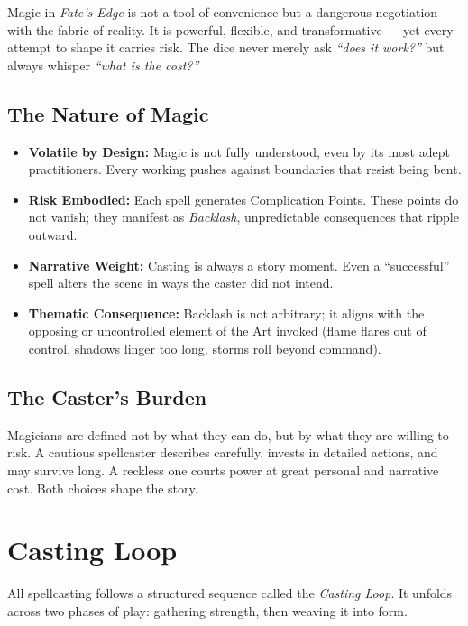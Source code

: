 \documentclass[12pt]{book}
\begin{document}
Magic in \textit{Fate’s Edge} is not a tool of convenience but a dangerous negotiation with the fabric of reality.  
It is powerful, flexible, and transformative — yet every attempt to shape it carries risk. The dice never merely ask \emph{“does it work?”} but always whisper \emph{“what is the cost?”}

\section{The Nature of Magic}
\begin{itemize}
  \item \textbf{Volatile by Design:} Magic is not fully understood, even by its most adept practitioners. Every working pushes against boundaries that resist being bent.  
  \item \textbf{Risk Embodied:} Each spell generates Complication Points. These points do not vanish; they manifest as \emph{Backlash}, unpredictable consequences that ripple outward.  
  \item \textbf{Narrative Weight:} Casting is always a story moment. Even a “successful” spell alters the scene in ways the caster did not intend.  
  \item \textbf{Thematic Consequence:} Backlash is not arbitrary; it aligns with the opposing or uncontrolled element of the Art invoked (flame flares out of control, shadows linger too long, storms roll beyond command).  
\end{itemize}

\section{The Caster’s Burden}
Magicians are defined not by what they can do, but by what they are willing to risk.  
A cautious spellcaster describes carefully, invests in detailed actions, and may survive long. A reckless one courts power at great personal and narrative cost. Both choices shape the story.

\chapter{Casting Loop}

All spellcasting follows a structured sequence called the \emph{Casting Loop}.  
It unfolds across two phases of play: gathering strength, then weaving it into form.
\end{document}
